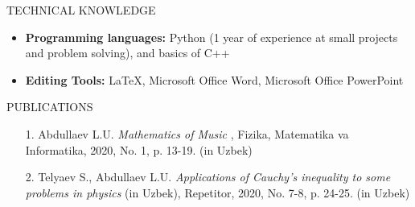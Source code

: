 \documentclass{resume} %
\begin{document}
\begin{rSection}{TECHNICAL KNOWLEDGE}
	\begin{itemize}
		\item \textbf{Programming languages:} Python (1 year of experience at small projects and problem solving), and basics of C++
		\item \textbf{Editing Tools:} LaTeX, Microsoft Office Word, Microsoft Office PowerPoint
	\end{itemize}
	
\end{rSection}

\begin{rSection}{PUBLICATIONS}
	\begin{itemize}
		\item[1.] Abdullaev L.U. \emph{Mathematics of Music} , Fizika, Matematika va Informatika, 2020, No. 1, p. 13-19. (in Uzbek)
		
		\item[2.] Telyaev S., Abdullaev L.U.  \emph{Applications of Cauchy's inequality to some problems in physics} (in Uzbek), Repetitor, 2020, No. 7-8, p. 24-25. (in Uzbek)
		
		
		
	\end{itemize}
\end{rSection}
\end{document}
